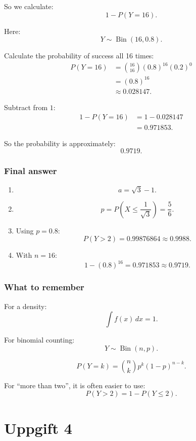 \documentclass[10pt]{article}
\begin{document}
So we calculate:
\[
1-P(Y=16).
\]

Here:
\[
Y\sim \operatorname{Bin}(16,0.8).
\]

Calculate the probability of success all 16 times:
\begin{align*}
P(Y=16)
&=
\binom{16}{16}
(0.8)^{16}(0.2)^0
\\[2mm]
&=
(0.8)^{16}
\\[2mm]
&\approx
0.028147.
\end{align*}

Subtract from \(1\):
\begin{align*}
1-P(Y=16)
&=
1-0.028147
\\[2mm]
&=
0.971853.
\end{align*}

So the probability is approximately:
\[
0.9719.
\]

\subsubsection*{Final answer}

\begin{enumerate}[label=\alph*)]
\item
\[
a=\sqrt{3}-1.
\]

\item
\[
p=P\left(X\le \frac{1}{\sqrt{3}}\right)
=\frac{5}{6}.
\]

\item
Using \(p=0.8\):
\[
P(Y>2)=0.99876864
\approx 0.9988.
\]

\item
With \(n=16\):
\[
1-(0.8)^{16}
=0.971853
\approx 0.9719.
\]
\end{enumerate}

\subsubsection*{What to remember}

For a density:
\[
\int f(x)\,dx=1.
\]

For binomial counting:
\[
Y\sim \operatorname{Bin}(n,p).
\]

\[
P(Y=k)
=
\binom{n}{k}
p^k(1-p)^{n-k}.
\]

For ``more than two'', it is often easier to use:
\[
P(Y>2)=1-P(Y\le 2).
\]

\section*{Uppgift 4}
\end{document}
